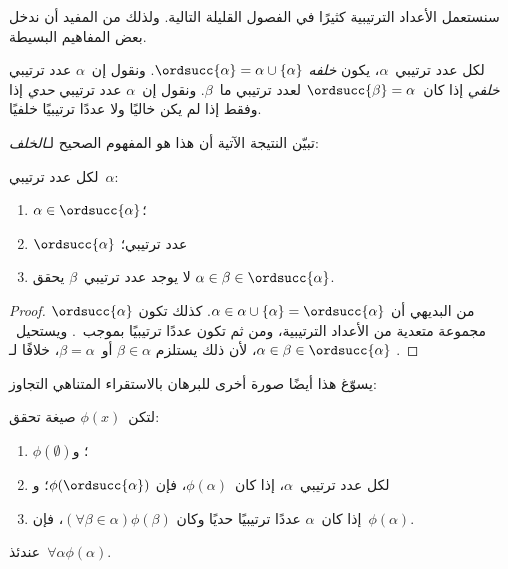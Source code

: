 \documentclass[../../../include/open-logic-section]{subfiles}
\begin{document}

سنستعمل الأعداد الترتيبية كثيرًا في الفصول القليلة التالية. ولذلك من
المفيد أن ندخل بعض المفاهيم البسيطة.

\begin{defn}
لكل عدد ترتيبي~$\alpha$، يكون \emph{خلفه}
$\ordsucc{\alpha} =\alpha \cup \{\alpha\}$. ونقول إن~$\alpha$
عدد ترتيبي \emph{خلفي} إذا كان~$\ordsucc{\beta} = \alpha$ لعدد ترتيبي
ما~$\beta$. ونقول إن~$\alpha$ عدد ترتيبي \emph{حدي} إذا وفقط إذا لم
يكن خاليًا ولا عددًا ترتيبيًا خلفيًا.
\end{defn}
\noindent
تبيّن النتيجة الآتية أن هذا هو المفهوم الصحيح لـ\emph{الخلف}:

\begin{prop}
لكل عدد ترتيبي~$\alpha$:
\begin{enumerate}
	\item $\alpha \in \ordsucc{\alpha}$؛
	\item $\ordsucc{\alpha}$ عدد ترتيبي؛
	\item لا يوجد عدد ترتيبي~$\beta$ يحقق
	$\alpha \in \beta \in \ordsucc{\alpha}$.
	\end{enumerate}
\end{prop}

\begin{proof}
من البديهي أن
$\alpha \in \alpha \cup \{\alpha\} = \ordsucc{\alpha}$. كذلك تكون
$\ordsucc{\alpha}$ مجموعة متعدية من الأعداد الترتيبية، ومن ثم تكون
عددًا ترتيبيًا بموجب~.
ويستحيل~$\alpha \in \beta \in \ordsucc{\alpha}$، لأن ذلك يستلزم
$\beta \in \alpha$ أو~$\beta = \alpha$، خلافًا لـ
.
\end{proof}
\noindent
يسوّغ هذا أيضًا صورة أخرى للبرهان بالاستقراء المتناهي التجاوز:

\begin{thm}
لتكن~$\phi(x)$ صيغة تحقق:
\begin{enumerate}
	\item $\phi(\emptyset)$؛ و
	\item لكل عدد ترتيبي~$\alpha$، إذا كان~$\phi(\alpha)$، فإن
	$\phi(\ordsucc{\alpha})$؛ و
	\item إذا كان~$\alpha$ عددًا ترتيبيًا حديًا وكان
	$(\forall \beta \in \alpha)\phi(\beta)$، فإن~$\phi(\alpha)$.
\end{enumerate}
عندئذ~$\forall \alpha \phi(\alpha)$.
\end{thm}
\end{document}
